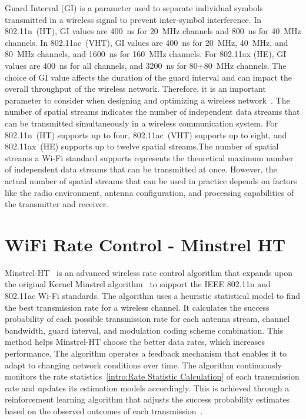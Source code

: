 Guard Interval (GI) is a parameter used to separate individual symbols transmitted in a wireless signal to prevent inter-symbol interference. In 802.11n~(HT), GI values are 400~ns for 20~MHz channels and 800~ns for 40~MHz channels. In 802.11ac~(VHT), GI values are 400~ns for 20~MHz, 40~MHz, and 80~MHz channels, and 1600~ns for 160~MHz channels. For 802.11ax (HE), GI values are 400~ns for all channels, and 3200~ns for 80+80~MHz channels. The choice of GI value affects the duration of the guard interval and can impact the overall throughput of the wireless network. Therefore, it is an important parameter to consider when designing and optimizing a wireless network~\cite{rappaport-2002}.
The number of spatial streams indicates the number of independent data streams that can be transmitted simultaneously in a wireless communication system. For 802.11n~(HT) supports up to four, 802.11ac~(VHT) supports up to eight, and 802.11ax~(HE) supports up to twelve spatial streams.The number of spatial streams a Wi-Fi standard supports represents the theoretical maximum number of independent data streams that can be transmitted at once. However, the actual number of spatial streams that can be used in practice depends on factors like the radio environment, antenna configuration, and processing capabilities of the transmitter and receiver.


\section{WiFi Rate Control - Minstrel HT}
\label{sec:intro:wifiratecontrol:MinstrelHT}

Minstrel-HT~\cite{MinstrelHT(2010)} is an advanced wireless rate control algorithm that expands upon the original Kernel Minstrel algorithm~\cite{MinstrelKernel} to support the IEEE 802.11n and 802.11ac Wi-Fi standards. The algorithm uses a heuristic statistical model to find the best transmission rate for a wireless channel. It calculates the success probability of each possible transmission rate for each antenna stream, channel bandwidth, guard interval, and modulation coding scheme combination. This method helps Minstrel-HT choose the better data rates, which increases performance. The algorithm operates a feedback mechanism that enables it to adapt to changing network conditions over time. The algorithm continuously monitors the rate statistics~\ref{intro:Rate Statistic Calculation} of each transmission rate and updates its estimation models accordingly. This is achieved through a reinforcement learning algorithm that adjusts the success probability estimates based on the observed outcomes of each transmission~\cite{liu2014minstrelht}.


